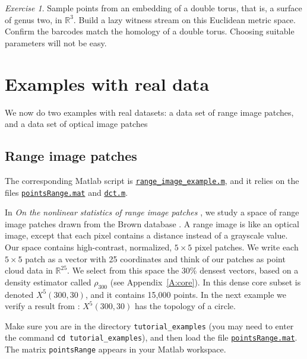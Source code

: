\documentclass[amscd, amssymb, verbatim]{amsart}[12pt]
\theoremstyle{remark}
\newtheorem{exercise}{Exercise}
\theoremstyle{remark}
\theoremstyle{remark}
\newcommand{\R}{\mathbb{R}}
\begin{document}
\begin{exercise}
Sample points from an embedding of a double torus, that is, a surface of genus two, in $\R^3$. Build a lazy witness stream on this Euclidean metric space. Confirm the barcodes match the homology of a double torus. Choosing suitable parameters will not be easy.
\end{exercise}



\section{Examples with real data}\label{S:real}

We now do two examples with real datasets: a data set of range image patches, and a data set of optical image patches


\subsection{Range image patches}

The corresponding Matlab script is \href{https://github.com/appliedtopology/javaplex/tree/master/src/matlab/for_distribution/tutorial_examples/range_image_example.m}{\texttt{range\_image\_example.m}}, and it relies on the files \href{https://github.com/appliedtopology/javaplex/tree/master/src/matlab/for_distribution/tutorial_examples/pointsRange.mat}{\texttt{pointsRange.mat}} and \href{https://github.com/appliedtopology/javaplex/tree/master/src/matlab/for_distribution/tutorial_examples/dct.m}{\texttt{dct.m}}. 

In {\em On the nonlinear statistics of range image patches} \citep{Range}, we study a space of range image patches drawn from the Brown database \citep{Mumford}. A range image is like an optical image, except that each pixel contains a distance instead of a grayscale value. Our space contains high-contrast, normalized, $5 \times5$ pixel patches. We write each $5\times5$ patch as a vector with 25 coordinates and think of our patches as point cloud data in $\R^{25}$. We select from this space the 30\% densest vectors, based on a density estimator called $\rho_{300}$ (see Appendix~\ref{A:core}). In \citet{Range} this dense core subset is denoted $X^5(300,30)$, and it contains 15,000 points. In the next example we verify a result from \citet{Range}: $X^5(300,30)$ has the topology of a circle. 

Make sure you are in the directory \texttt{tutorial\_examples} (you may need to enter the command \texttt{cd tutorial\_examples}), and then load the file \href{https://github.com/appliedtopology/javaplex/tree/master/src/matlab/for_distribution/tutorial_examples/pointsRange.mat}{\texttt{pointsRange.mat}}. The matrix \texttt{pointsRange} appears in your Matlab workspace.
\end{document}
